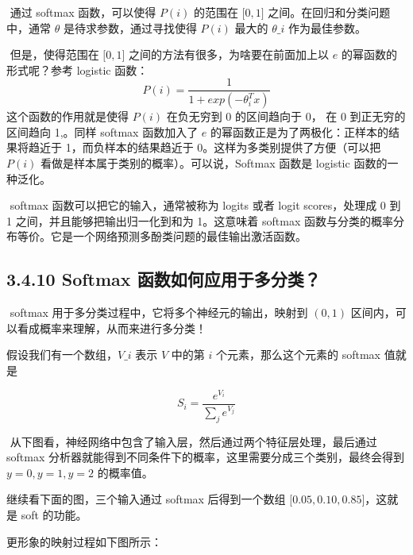 ​ 通过 softmax 函数，可以使得 $ P(i) $ 的范围在 $ {[}0,1{]} $
之间。在回归和分类问题中，通常 $ \theta $ 是待求参数，通过寻找使得 $
P(i) $ 最大的 $ \theta\_i $ 作为最佳参数。

​ 但是，使得范围在 $ {[}0,1{]} $ 之间的方法有很多，为啥要在前面加上以
$ e $ 的幂函数的形式呢？参考 logistic 函数： \[
P(i) = \frac{1}{1+exp(-\theta_i^T x)}
\] ​ 这个函数的作用就是使得 $ P(i) $ 在负无穷到 0 的区间趋向于 0， 在
0 到正无穷的区间趋向 1,。同样 softmax 函数加入了 $ e $
的幂函数正是为了两极化：正样本的结果将趋近于 1，而负样本的结果趋近于
0。这样为多类别提供了方便（可以把 $ P(i) $
看做是样本属于类别的概率）。可以说，Softmax 函数是 logistic
函数的一种泛化。

​ softmax 函数可以把它的输入，通常被称为 logits 或者 logit
scores，处理成 0 到 1 之间，并且能够把输出归一化到和为 1。这意味着
softmax
函数与分类的概率分布等价。它是一个网络预测多酚类问题的最佳输出激活函数。

\subsection{3.4.10 Softmax
函数如何应用于多分类？}\label{softmax-ux51fdux6570ux5982ux4f55ux5e94ux7528ux4e8eux591aux5206ux7c7b}

​ softmax 用于多分类过程中，它将多个神经元的输出，映射到 $ (0,1) $
区间内，可以看成概率来理解，从而来进行多分类！

​ 假设我们有一个数组，$ V\_i $ 表示 $ V $ 中的第 $ i $
个元素，那么这个元素的 softmax 值就是

\[
S_i = \frac{e^{V_i}}{\sum_j e^{V_j}}
\]

​ 从下图看，神经网络中包含了输入层，然后通过两个特征层处理，最后通过
softmax 分析器就能得到不同条件下的概率，这里需要分成三个类别，最终会得到
$ y=0, y=1, y=2 $ 的概率值。

 

继续看下面的图，三个输入通过 softmax 后得到一个数组 $ {[}0.05 , 0.10 ,
0.85{]} $，这就是 soft 的功能。

 

更形象的映射过程如下图所示：

\caption{****}

